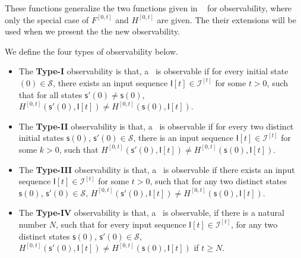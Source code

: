 These functions generalize the two functions given in ~\cite{Zhang2016Observability} for observability,  where only the special case of $F^{[0,t]}$ and $H^{[0,t]}$ are given. The their extensions  will be used when we present the the new observability.
\begin{definition} 
We define the four types of observability below. 
\begin{itemize}
  \item The {\bf Type-I} observability is that, a \BCN\ is observable if for every initial state \State$(0)\in \mathcal{S}$, there exists an input sequence $\mathsf{I}[t]\in\mathcal{I}^{[t]}$ for some $t>0$, such that for all states $\mathsf{s}'(0)\neq \mathsf{s}(0)$, $H^{[0,t]}(\mathsf{s}'(0),\mathsf{I}[t])\neq H^{[0,t]}(\mathsf{s}(0), \mathsf{I}[t])$.
  \item The  {\bf Type-II} observability is that, a \BCN\ is observable if for every two distinct initial states $\mathsf{s}(0)$, $\mathsf{s}'(0) \in \mathcal{S}$, there is an input sequence $\mathsf{I}[t]\in\mathcal{I}^{[t]}$ for some $k>0$, such that $H^{[0,t]}(\mathsf{s}'(0),\mathsf{I}[t])\neq H^{[0,t]}(\mathsf{s}(0), \mathsf{I}[t])$.
  \item The {\bf Type-III} observability is that, a \BCN\ is observable if there exists an input sequence $\mathsf{I}[t]\in\mathcal{I}^{[t]}$ for some $t>0$, such that for any two distinct states $\mathsf{s}(0)$, $\mathsf{s}'(0) \in \mathcal{S}$, $H^{[0,t]}(\mathsf{s}'(0),\mathsf{I}[t])\neq H^{[0,t]}(\mathsf{s}(0), \mathsf{I}[t])$.
  \item The {\bf Type-IV} observability is that, a \BCN\ is observable, if there is a  natural number $N$, such that for every input sequence $\mathsf{I}[t]\in\mathcal{I}^{[t]}$, for any two distinct states $\mathsf{s}(0)$, $\mathsf{s}'(0) \in \mathcal{S}$, $H^{[0,t]}(\mathsf{s}'(0),\mathsf{I}[t])\neq H^{[0,t]}(\mathsf{s}(0), \mathsf{I}[t])$ if  $t\ge N$.
\end{itemize} 
\end{definition}



